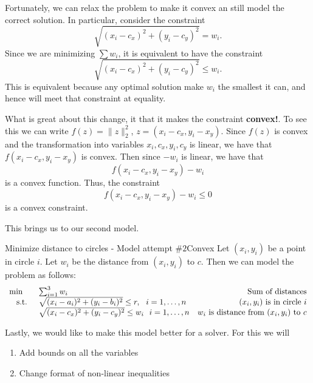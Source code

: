 Fortunately, we can relax the problem to make it convex an still model the correct solution.  In particular, consider the constraint 
$$
 \sqrt{(x_i - c_x)^2 + (y_i - c_y)^2} = w_i .
$$
Since we are minimizing $\sum w_i$, it is equivalent to have the constraint
$$
 \sqrt{(x_i - c_x)^2 + (y_i - c_y)^2} \leq w_i.
$$
This is equivalent because any optimal solution make $w_i$ the smallest it can, and hence will meet that constraint at equality.  

What is great about this change, it that it makes the constraint \textbf{convex!}. To see this we can write $f(z) = \|z\|_2^2$, $z = (x_i - c_x, y_i - x_y)$.  Since $f(z)$ is convex and the transformation into variables $x_i, c_x, y_i, c_y$ is linear, we have that $f(x_i - c_x, y_i - x_y)$ is convex.   Then since $-w_i$ is linear, we have that
$$
f(x_i - c_x, y_i - x_y) - w_i
$$
is a convex function.  Thus, the constraint 
$$
f(x_i - c_x, y_i - x_y) - w_i \leq 0 
$$
is a convex constraint.


This brings us to our second model.


\begin{general}{Minimize distance to circles - Model attempt $\#2$}{Convex}
Let $(x_i,y_i)$ be a point in circle $i$.  Let $w_i$ be the distance from $(x_i, y_i)$ to $c$.  Then we can  model the problem as follows:
\begin{equation}
\begin{array}{rlr}
\min \quad & \sum_{i=1}^3 w_i \hfill & \text{ Sum of distances}\\
\text{ s.t. } &  \sqrt{(x_i - a_i)^2  + (y_i - b_i)^2}  \leq r , \ \ i=1,\dots, n& \text{ $(x_i, y_i)$ is in circle $i$}\\
& \sqrt{(x_i - c_x)^2 + (y_i - c_y)^2}\leq w_i \ \ i=1, \dots, n & \text{$w_i$ is distance from $(x_i, y_i)$ to $c$}\\
\end{array}
\end{equation}
\end{general}

Lastly, we would like to make this model better for a solver.  For this we will

\begin{enumerate}
\item Add bounds on all the variables
\item Change format of non-linear inequalities
\end{enumerate}

